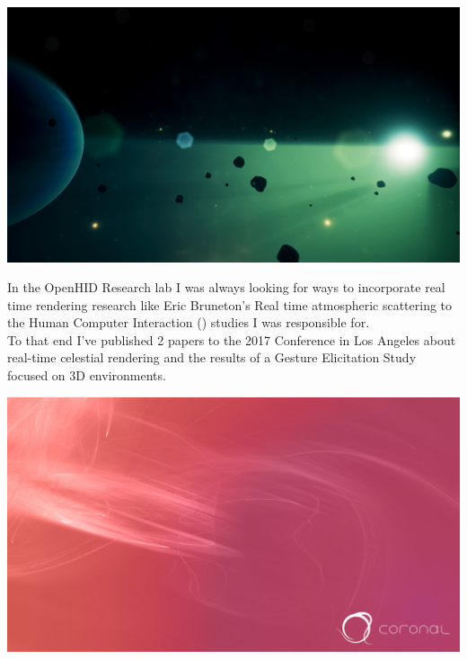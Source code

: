 \documentclass[10pt,a4paper]{article}
\begin{document}
\begin{multicols}{2}
\vspace{1.3em}

\noindent \includegraphics[width=\linewidth]{../portfolio/research/realtime-celestial-rendering/assets/cover.jpg}

\vspace{1.3em}

In the OpenHID Research lab I was always looking for ways to incorporate real time rendering research like Eric Bruneton's Real time atmospheric scattering to the Human Computer Interaction () studies I was responsible for.\\

To that end I've published 2 papers to the  2017 Conference in Los Angeles about real-time celestial rendering and the results of a Gesture Elicitation Study focused on 3D environments.


\vspace{1.3em}

\noindent \includegraphics[width=\linewidth]{../portfolio/libraries/coronal/assets/cover.jpg}


\vspace{1.3em}


\end{multicols}
\end{document}
